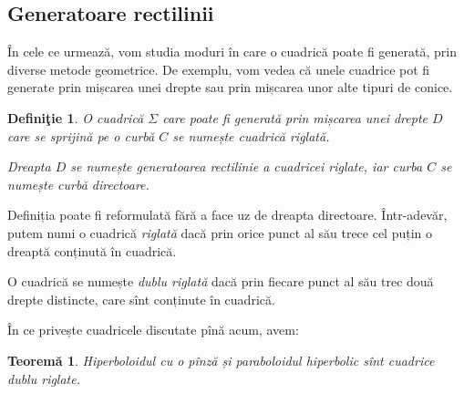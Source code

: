 \documentclass[11pt,a4paper]{article}
\theoremstyle{dotless}
\newtheorem{theorem}{Teorem\u{a}}[section]
\theoremstyle{dotlessdr}
\newtheorem{definition}{Defini\c{t}ie}[section]
\begin{document}

\subsection{Generatoare rectilinii}

\indent\indent În cele ce urmează, vom studia moduri în care o cuadrică poate fi
generată, prin diverse metode geometrice. De exemplu, vom vedea că unele cuadrice
pot fi generate prin mișcarea unei drepte sau prin mișcarea unor alte tipuri
de conice.

\begin{definition}
	O cuadrică $\Sigma$ care poate fi generată prin mișcarea unei drepte $D$
care se sprijină pe o curbă $C$ se numește \emph{cuadrică riglată}.

Dreapta $D$ se numește \emph{generatoarea rectilinie} a cuadricei riglate,
iar curba $C$ se numește \emph{curbă directoare}.

\end{definition}

Definiția poate fi reformulată fără a face uz de dreapta directoare. Într-adevăr,
putem numi o cuadrică \emph{riglată} dacă prin orice punct al său trece cel puțin
o dreaptă conținută în cuadrică.

O cuadrică se numește \emph{dublu riglată} dacă prin fiecare punct al său trec
două drepte distincte, care sînt conținute în cuadrică.


În ce privește cuadricele discutate pînă acum, avem:
\begin{theorem}
	Hiperboloidul cu o pînză și paraboloidul hiperbolic sînt cuadrice 
dublu riglate.
\end{theorem}
\end{document}
